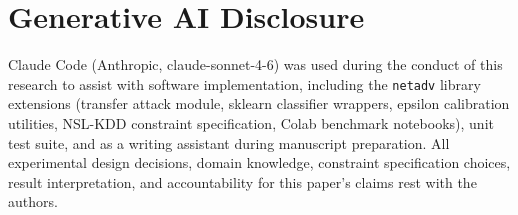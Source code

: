 \documentclass[sigconf,anonymous=true]{acmart}
\begin{document}
\section*{Generative AI Disclosure}

Claude Code (Anthropic, claude-sonnet-4-6) was used during the conduct
of this research to assist with software implementation, including the
\texttt{netadv} library extensions (transfer attack module, sklearn
classifier wrappers, epsilon calibration utilities, NSL-KDD constraint
specification, Colab benchmark notebooks), unit test suite, and as a
writing assistant during manuscript preparation.  All experimental
design decisions, domain knowledge, constraint specification choices,
result interpretation, and accountability for this paper's claims rest
with the authors.
\end{document}

